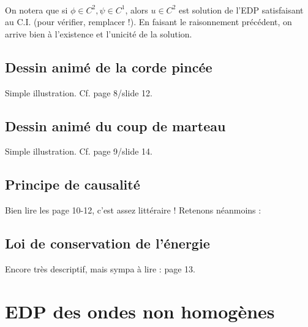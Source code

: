 \documentclass[british,french,11pt, a4paper, openany]{book}
\begin{document}
			\ \\
			On notera que si $\phi \in C^2, \psi \in C^1$, alors $u\in C^2$ est solution de l'EDP satisfaisant au C.I. (pour vérifier, remplacer !). En faisant le raisonnement précédent, on arrive bien à l'existence et l'unicité de la solution.
																
			\subsection{Dessin animé de la corde pincée}
			Simple illustration. Cf. page 8/slide 12.
																
			\subsection{Dessin animé du coup de marteau}
			Simple illustration. Cf. page 9/slide 14.
																
			\subsection{Principe de causalité}
			Bien lire les page 10-12, c'est assez littéraire ! Retenons néanmoins :\\
																
																
			\subsection{Loi de conservation de l'énergie}
			Encore très descriptif, mais sympa à lire : page 13.
																
																
			\section{EDP des ondes non homogènes}
\end{document}
